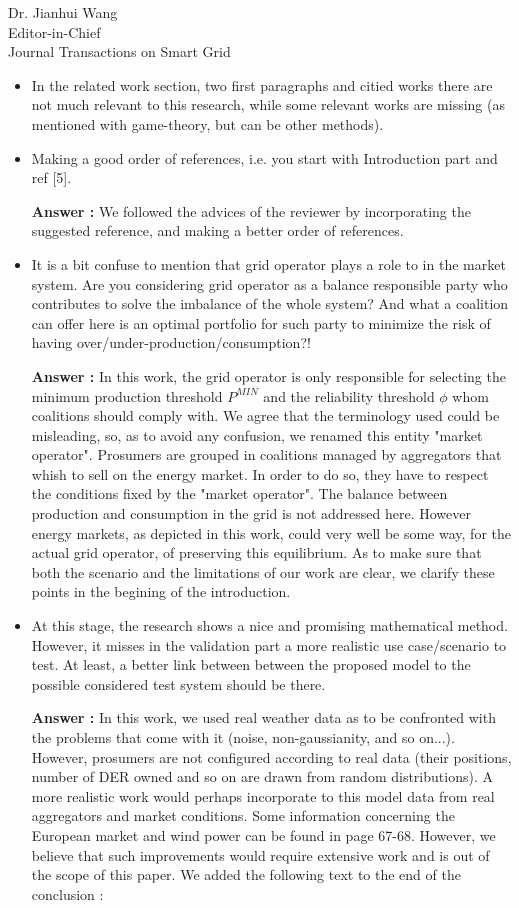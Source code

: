 \documentclass{letter}
\begin{document}
\begin{letter}{Dr. Jianhui Wang \\ Editor-in-Chief \\ Journal Transactions on Smart Grid }
\begin{itemize}
\begin{itemize}
		\item In the related work section, two first paragraphs and citied works there are not much relevant to this research, while some relevant works are missing (as mentioned with game-theory, but can be other methods).

		\item Making a good order of references, i.e. you start with Introduction part and ref [5].

		\textbf{Answer :}  We followed the advices of the reviewer by incorporating the suggested reference, and making a better order of references.
		
		\item It is a bit confuse to mention that grid operator plays a role to in the market system. Are you considering grid operator as a balance responsible party who contributes to solve the imbalance of the whole system? And what a coalition can offer here is an optimal portfolio for such party to minimize the risk of having over/under-production/consumption?!
		
		\textbf{Answer :} In this work, the grid operator is only responsible for selecting the minimum production threshold $P^{MIN}$ and the reliability threshold $ \phi $ whom coalitions should comply with. We agree that the terminology used could be misleading, so, as to avoid any confusion, we renamed this entity "market operator". Prosumers are grouped in coalitions managed by aggregators that whish to sell on the energy market. In order to do so, they have to respect the conditions fixed by the "market operator". The balance between production and consumption in the grid is not addressed here. However energy markets, as depicted in this work, could very well be some way, for the actual grid operator, of preserving this equilibrium. As to make sure that both the scenario and the limitations of our work are clear, we clarify these points in the begining of the introduction.

		
		\item At this stage, the research shows a nice and promising mathematical method. However, it misses in the validation part a more realistic use case/scenario to test. At least, a better link between between the proposed model to the possible considered test system should be there.
		
		\textbf{Answer :} In this work, we used real weather data as to be confronted with the problems that come with it (noise, non-gaussianity, and so on...). However, prosumers are not configured according to real data (their positions, number of DER owned and so on are drawn from random distributions). A more realistic work would perhaps incorporate to this model data from real aggregators and market conditions. Some information concerning the European market and wind power can be found in \cite{Europe} page 67-68. However, we believe that such improvements would require extensive work and is out of the scope of this paper. We added the following text to the end of the conclusion : 
		

\end{itemize}
\end{itemize}
\end{letter}
\end{document}
